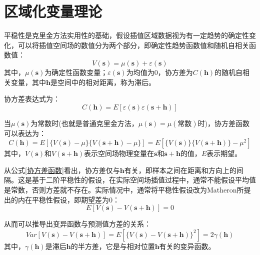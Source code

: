 \section{区域化变量理论}
平稳性是克里金方法实用性的基础，假设插值区域数据视为有一定趋势的确定性变化，可以将插值空间场的数值分为两个部分，即确定性趋势函数值和随机自相关函数值：
\begin{equation}
    V \left( \mathbf{s} \right) = \mu \left( \mathbf{s} \right) + \varepsilon \left( \mathbf{s} \right)
    \label{区域化变量}
\end{equation}
其中，$ \mu \left( \mathbf{s} \right) $为确定性函数变量；$ \varepsilon \left( \mathbf{s} \right) $为均值为0，协方差为$ C\left( \mathbf{h} \right) $的随机自相关变量，其中$ \mathbf{h} $是空间中的相对距离，称为滞后。

协方差表达式为：
\begin{equation}
    C\left( \mathbf{h} \right) = E \left[ \varepsilon \left( \mathbf{s} \right) \varepsilon \left( \mathbf{s} + \mathbf{h} \right) \right]
    \label{协方差表达式}
\end{equation}

当$ \mu \left( \mathbf{s} \right) $为常数时(也就是普通克里金方法，$ \mu \left( \mathbf{s} \right) = \mu \left( \text{常数} \right) $时)，协方差函数可以表达为：
\begin{equation}
    C\left( \mathbf{h} \right) = E \left[ \{ V\left( \mathbf{s} \right) - \mu \} \{ V\left( \mathbf{s} + \mathbf{h} \right) - \mu \} \right] = E \left[ \{ V \left( \mathbf{s} \right) \} \{ V \left( \mathbf{s} + \mathbf{h} \right) \} - \mu^{2} \right]
    \label{协方差函数}
\end{equation}
其中，$  V \left( \mathbf{s} \right) $和$ V \left( \mathbf{s} + \mathbf{h} \right) $表示空间场物理变量在$ \mathbf{s} $和$ \mathbf{s} + \mathbf{h} $的值，$ E $表示期望。

从公式\ref{协方差函数}看出，协方差仅与$ \mathbf{h} $有关，即样本之间在距离和方向上的间隔。这是基于二阶平稳性的假设，在实际空间场插值过程中，通常不能假设平均值是常数，否则方差就不存在。实际情况中，通常将平稳性假设改为Matheron所提出的内在平稳性假设\textsuperscript{\cite{matheron1965variables}}，即期望差为0：
\begin{equation}
    E\left[ V\left( \mathbf{s} \right) - V \left( \mathbf{s} + \mathbf{h} \right) \right] = 0
\end{equation}

从而可以推导出变异函数与预测值方差的关系：
\begin{equation}
    Var \left[ V\left( \mathbf{s} \right) - V\left( \mathbf{s} + \mathbf{h} \right) \right] = E\left[ \{ V\left( \mathbf{s} \right) - V \left( \mathbf{s} + \mathbf{h} \right) \}^{2} \right] = 2 \gamma\left( \mathbf{h} \right)
\end{equation}
其中，$ \gamma\left( \mathbf{h} \right) $是滞后$ \mathbf{h} $的半方差，它是与相对位置$ \mathbf{h} $有关的变异函数。

